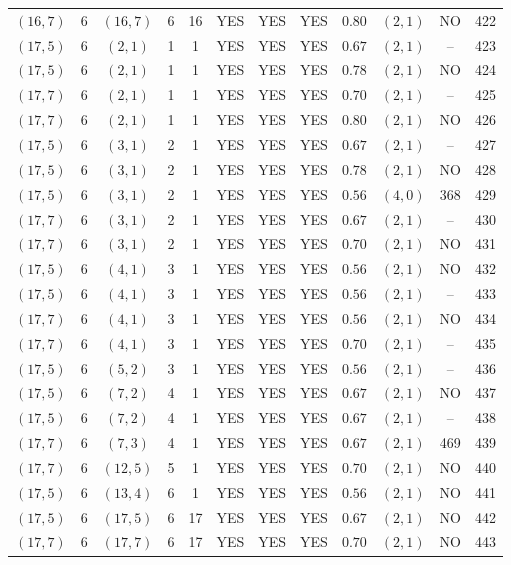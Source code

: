 \begin{longtable}{|c|c|c|c|c|c|c|c|c|c|c|c|}
$(16,7)$ & 6 & $(16,7)$ & 6 & 16 & YES & YES & YES & $0.80$ & $(2,1)$ & NO & 422\\
$(17,5)$ & 6 & $(2,1)$ & 1 & 1 & YES & YES & YES & $0.67$ & $(2,1)$ & -- & 423\\
$(17,5)$ & 6 & $(2,1)$ & 1 & 1 & YES & YES & YES & $0.78$ & $(2,1)$ & NO & 424\\
$(17,7)$ & 6 & $(2,1)$ & 1 & 1 & YES & YES & YES & $0.70$ & $(2,1)$ & -- & 425\\
$(17,7)$ & 6 & $(2,1)$ & 1 & 1 & YES & YES & YES & $0.80$ & $(2,1)$ & NO & 426\\
$(17,5)$ & 6 & $(3,1)$ & 2 & 1 & YES & YES & YES & $0.67$ & $(2,1)$ & -- & 427\\
$(17,5)$ & 6 & $(3,1)$ & 2 & 1 & YES & YES & YES & $0.78$ & $(2,1)$ & NO & 428\\
$(17,5)$ & 6 & $(3,1)$ & 2 & 1 & YES & YES & YES & $0.56$ & $(4,0)$ & 368 & 429\\
$(17,7)$ & 6 & $(3,1)$ & 2 & 1 & YES & YES & YES & $0.67$ & $(2,1)$ & -- & 430\\
$(17,7)$ & 6 & $(3,1)$ & 2 & 1 & YES & YES & YES & $0.70$ & $(2,1)$ & NO & 431\\
$(17,5)$ & 6 & $(4,1)$ & 3 & 1 & YES & YES & YES & $0.56$ & $(2,1)$ & NO & 432\\
$(17,5)$ & 6 & $(4,1)$ & 3 & 1 & YES & YES & YES & $0.56$ & $(2,1)$ & -- & 433\\
$(17,7)$ & 6 & $(4,1)$ & 3 & 1 & YES & YES & YES & $0.56$ & $(2,1)$ & NO & 434\\
$(17,7)$ & 6 & $(4,1)$ & 3 & 1 & YES & YES & YES & $0.70$ & $(2,1)$ & -- & 435\\
$(17,5)$ & 6 & $(5,2)$ & 3 & 1 & YES & YES & YES & $0.56$ & $(2,1)$ & -- & 436\\
$(17,5)$ & 6 & $(7,2)$ & 4 & 1 & YES & YES & YES & $0.67$ & $(2,1)$ & NO & 437\\
$(17,5)$ & 6 & $(7,2)$ & 4 & 1 & YES & YES & YES & $0.67$ & $(2,1)$ & -- & 438\\
$(17,7)$ & 6 & $(7,3)$ & 4 & 1 & YES & YES & YES & $0.67$ & $(2,1)$ & 469 & 439\\
$(17,7)$ & 6 & $(12,5)$ & 5 & 1 & YES & YES & YES & $0.70$ & $(2,1)$ & NO & 440\\
$(17,5)$ & 6 & $(13,4)$ & 6 & 1 & YES & YES & YES & $0.56$ & $(2,1)$ & NO & 441\\
$(17,5)$ & 6 & $(17,5)$ & 6 & 17 & YES & YES & YES & $0.67$ & $(2,1)$ & NO & 442\\
$(17,7)$ & 6 & $(17,7)$ & 6 & 17 & YES & YES & YES & $0.70$ & $(2,1)$ & NO & 443\\

\end{longtable}
